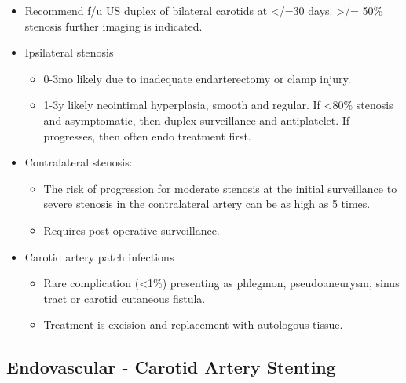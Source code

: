 \documentclass[
]{book}
\begin{document}
\begin{itemize}
\item
  Recommend f/u US duplex of bilateral carotids at \textless/=30 days. \textgreater/=
  50\% stenosis further imaging is indicated.
\item
  Ipsilateral stenosis

  \begin{itemize}
  \item
    0-3mo likely due to inadequate endarterectomy or clamp
    injury.\citep{kang2014}
  \item
    1-3y likely neointimal hyperplasia, smooth and regular. If \textless80\%
    stenosis and asymptomatic, then duplex surveillance and
    antiplatelet. If progresses, then often endo treatment
    first.\citep{garzon-muvdi2016}
  \end{itemize}
\item
  Contralateral stenosis:

  \begin{itemize}
  \item
    The risk of progression for moderate stenosis at the initial
    surveillance to severe stenosis in the contralateral artery can
    be as high as 5 times.
  \item
    Requires post-operative surveillance.
  \end{itemize}
\item
  Carotid artery patch infections

  \begin{itemize}
  \item
    Rare complication (\textless1\%) presenting as phlegmon, pseudoaneurysm,
    sinus tract or carotid cutaneous fistula.\citep{stone2011}
  \item
    Treatment is excision and replacement with autologous
    tissue.\citep{fatima2019}
  \end{itemize}
\end{itemize}

\hypertarget{endovascular---carotid-artery-stenting}{%
\subsection{Endovascular - Carotid Artery Stenting}\label{endovascular---carotid-artery-stenting}}
\end{document}

